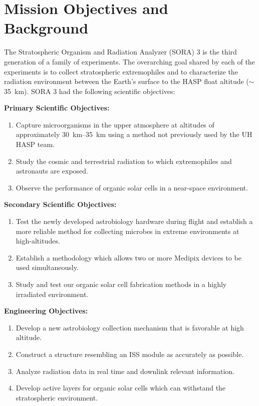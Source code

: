 \section{Mission Objectives and Background}
\label{sec:Introduction}
\newcommand{\indentitem}{\setlength\itemindent{25pt}}%

The Stratospheric Organism and Radiation Analyzer (SORA) 3 is the third generation of a family of experiments.
The overarching goal shared by each of the experiments is to collect stratospheric extremophiles and to characterize the radiation environment between the Earth's surface to the HASP float altitude ($\sim$\SI{35}{\kilo\meter}).
SORA 3 had the following scientific objectives:

\vspace{0.5cm}
\noindent \textbf {Primary Scientific Objectives:}
\begin{enumerate}
\item Capture microorganisms in the upper atmosphere at altitudes of approximately \SIrange{30}{35}{\kilo\meter} using a method not previously used by the UH HASP team. 
\item Study the cosmic and terrestrial radiation to which extremophiles and astronauts are exposed.
\item Observe the performance of organic solar cells in a near-space environment.
\end{enumerate}

\vspace{0.5cm}
\noindent \textbf {Secondary Scientific Objectives:}
\begin{enumerate}
\item Test the newly developed astrobiology hardware during flight and establish a more reliable method for collecting microbes in extreme environments at high-altitudes.
\item Establish a methodology which allows two or more Medipix devices to be used simultaneously.
\item Study and test our organic solar cell fabrication methods in a highly irradiated environment.
\end{enumerate}

\vspace{0.5cm}
\noindent \textbf {Engineering Objectives:}
\begin{enumerate}
\item Develop a new astrobiology collection mechanism that is favorable at high altitude.
\item Construct a structure resembling an ISS module as accurately as possible.
\item Analyze radiation data in real time and downlink relevant information.
\item Develop active layers for organic solar cells which can withstand the stratospheric environment.
\end{enumerate}

